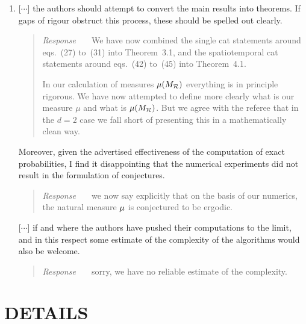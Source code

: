 \documentclass[12pt]{iopart}
\begin{document}
\begin{enumerate}
\begin{quote}
{\em Response~~~}
Sorry, we do not feel the suggested reformulation would improve the exposition.
And a Hamming's distance does not work for us, we use the L2 distance of
Figure~7.
\end{quote}

  \item
{[$\cdots$]} the authors should attempt to convert the main results into
theorems. If gaps of rigour obstruct this process, these should be
spelled out clearly.

\begin{quote}
{\em Response~~~}
We have now combined the single cat statements around eqs.~(27) to~(31)
into Theorem~3.1, and the spatiotemporal cat statements around eqs.~(42)
to~(45) into Theorem~4.1.

In our calculation of measures  $\mu(M_{\mathcal{R}})$ everything is in principle
rigorous.
We have now attempted to define  more clearly what is our measure $\mu$
and what is  $\mu(M_{\mathcal{R}})$. But we agree with the referee that in the $d=2$
case we fall short of presenting this in a mathematically
clean way.
\end{quote}

Moreover, given the advertised effectiveness of the computation of exact
probabilities, I find it disappointing that the numerical experiments did
not result in the formulation of conjectures.

\begin{quote}
{\em Response~~~}
we now say explicitly that on the basis of our numerics, the natural
measure ${\mu}$ is conjectured to be ergodic.
\end{quote}

[$\cdots$]
if and where the authors have pushed their computations to the limit, and
in this respect some estimate of the complexity of the algorithms would
also be welcome.
\begin{quote}
{\em Response~~~}
sorry, we have no reliable estimate of the complexity.
\end{quote}

\end{enumerate}

\section*{DETAILS}
\end{document}

